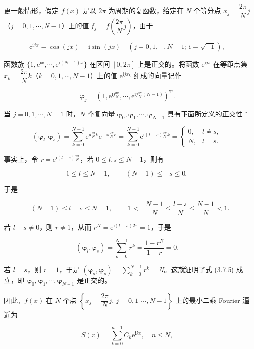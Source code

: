 \documentclass[
  10pt,
  fontset=fandol]{ctexart}
\begin{document}
更一般情形，假定 \(f(x)\) 是以 \(2\pi\) 为周期的复函数，给定在 \(N\) 个等分点 \(x_j=\dfrac{2\pi}{N}j\)（\(j=0,1,\cdots,N-1\)）上的值 \(f_j=f\left(\dfrac{2\pi}{N}j\right)\)，由于

\[
\mathrm e^{\mathrm ijx}=\cos(jx)+\mathrm i\sin(jx)\quad(j=0,1,\cdots,N-1;\ \mathrm i=\sqrt{-1}),
\]

函数族 \(\{1,\mathrm e^{\mathrm ix},\cdots,\mathrm e^{\mathrm i(N-1)x}\}\) 在区间 \([0,2\pi]\) 上是正交的。将函数 \(\mathrm e^{\mathrm ijx}\) 在等距点集 \(x_k=\dfrac{2\pi}{N}k\)（\(k=0,1,\cdots,N-1\)）上的值 \(\mathrm e^{\mathrm ijx_k}\) 组成的向量记作

\[
\boldsymbol\varphi_j=\left(1,\mathrm e^{\mathrm ij\frac{2\pi}{N}},\cdots,\mathrm e^{\mathrm ij\frac{2\pi}{N}(N-1)}\right)^{\mathrm T}.
\]

当 \(j=0,1,\cdots,N-1\) 时，\(N\) 个复向量 \(\boldsymbol\varphi_0,\boldsymbol\varphi_1,\cdots,\boldsymbol\varphi_{N-1}\) 具有下面所定义的正交性：

\[
(\boldsymbol\varphi_l,\boldsymbol\varphi_s)=\sum_{k=0}^{N-1}\mathrm e^{\mathrm il\frac{2\pi}{N}k}\mathrm e^{-\mathrm is\frac{2\pi}{N}k}=\sum_{k=0}^{N-1}\mathrm e^{\mathrm i(l-s)\frac{2\pi}{N}k}=\begin{cases}0,&l\ne s,\\N,&l=s.\end{cases}\tag{3.7.5}
\]

事实上，令 \(r=\mathrm e^{\mathrm i(l-s)\frac{2\pi}{N}}\)，若 \(0\leqslant l,s\leqslant N-1\)，则有

\[
0\leqslant l\leqslant N-1,\quad-(N-1)\leqslant-s\leqslant0,
\]

于是

\[
-(N-1)\leqslant l-s\leqslant N-1,\quad-1<-\frac{N-1}{N}\leqslant\frac{l-s}{N}\leqslant\frac{N-1}{N}<1.
\]

若 \(l-s\ne0\)，则 \(r\ne1\)，从而 \(r^N=\mathrm e^{\mathrm i(l-s)2\pi}=1\)，于是

\[
(\boldsymbol\varphi_l,\boldsymbol\varphi_s)=\sum_{k=0}^{N-1}r^k=\frac{1-r^N}{1-r}=0.
\]

若 \(l=s\)，则 \(r=1\)，于是 \((\boldsymbol\varphi_s,\boldsymbol\varphi_s)=\sum_{k=0}^{N-1}r^k=N\)。这就证明了式 (3.7.5) 成立，即 \(\boldsymbol\varphi_0,\boldsymbol\varphi_1,\cdots,\boldsymbol\varphi_{N-1}\) 是正交的。

因此，\(f(x)\) 在 \(N\) 个点 \(\left\{x_j=\dfrac{2\pi}{N}j,\ j=0,1,\cdots,N-1\right\}\) 上的最小二乘 Fourier 逼近为

\[
S(x)=\sum_{k=0}^{n-1}C_k\mathrm e^{\mathrm ikx},\quad n\leqslant N,\tag{3.7.6}
\]
\end{document}
